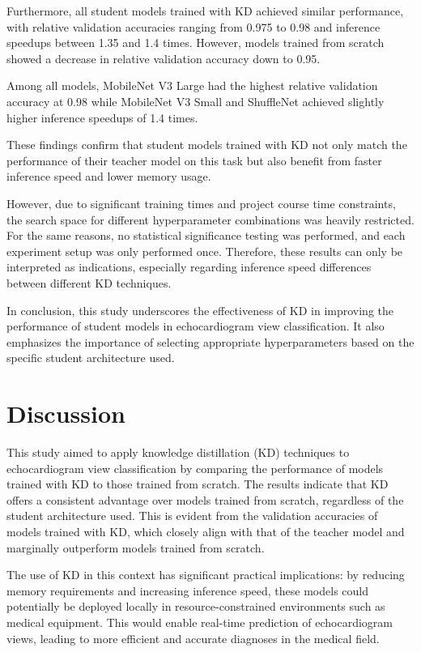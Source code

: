 \documentclass[12pt]{article}
\begin{document}
Furthermore, all student models trained with KD achieved similar performance, with relative validation accuracies ranging from 0.975 to 0.98 and inference speedups between 1.35 and 1.4 times. However, models trained from scratch showed a decrease in relative validation accuracy down to 0.95.

Among all models, MobileNet V3 Large had the highest relative validation accuracy at 0.98 while MobileNet V3 Small and ShuffleNet achieved slightly higher inference speedups of 1.4 times.

These findings confirm that student models trained with KD not only match the performance of their teacher model on this task but also benefit from faster inference speed and lower memory usage.

However, due to significant training times and project course time constraints, the search space for different hyperparameter combinations was heavily restricted. For the same reasons, no statistical significance testing was performed, and each experiment setup was only performed once. Therefore, these results can only be interpreted as indications, especially regarding inference speed differences between different KD techniques.

In conclusion, this study underscores the effectiveness of KD in improving the performance of student models in echocardiogram view classification. It also emphasizes the importance of selecting appropriate hyperparameters based on the specific student architecture used.

\section{Discussion}

This study aimed to apply knowledge distillation (KD) techniques to echocardiogram view classification by comparing the performance of models trained with KD to those trained from scratch. The results indicate that KD offers a consistent advantage over models trained from scratch, regardless of the student architecture used. This is evident from the validation accuracies of models trained with KD, which closely align with that of the teacher model and marginally outperform models trained from scratch.

The use of KD in this context has significant practical implications: by reducing memory requirements and increasing inference speed, these models could potentially be deployed locally in resource-constrained environments such as medical equipment. This would enable real-time prediction of echocardiogram views, leading to more efficient and accurate diagnoses in the medical field.
\end{document}
